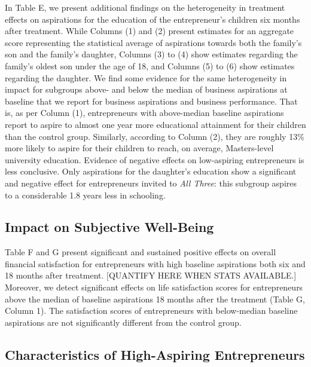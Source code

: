 \documentclass[11.5pt]{article}
\begin{document}
In Table E, we present additional findings on the heterogeneity in treatment effects on aspirations for the education of the entrepreneur's children six months after treatment. While Columns (1) and (2) present estimates for an aggregate score representing the statistical average of aspirations towards both the family's son and the family's daughter, Columns (3) to (4) show estimates regarding the family's oldest son under the age of 18, and Columns (5) to (6) show estimates regarding the daughter. We find some evidence for the same heterogeneity in impact for subgroups above- and below the median of business aspirations at baseline that we report for business aspirations and business performance. That is, as per Column (1), entrepreneurs with above-median baseline aspirations report to aspire to almost one year more educational attainment for their children than the control group. Similarly, according to Column (2), they are roughly 13\% more likely to aspire for their children to reach, on average, Masters-level university education. Evidence of negative effects on low-aspiring entrepreneurs is less conclusive. Only aspirations for the daughter's education show a significant and negative effect for entrepreneurs invited to \emph{All Three}: this subgroup aspires to a considerable 1.8 years less in schooling. 

\subsection{Impact on Subjective Well-Being}

Table F and G present significant and sustained positive effects on overall financial satisfaction for entrepreneurs with high baseline aspirations both six and 18 months after treatment. [QUANTIFY HERE WHEN STATS AVAILABLE.] Moreover, we detect significant effects on life satisfaction scores for entrepreneurs above the median of baseline aspirations 18 months after the treatment (Table G, Column 1). The satisfaction scores of entrepreneurs with below-median baseline aspirations are not significantly different from the control group.

\subsection{Characteristics of High-Aspiring Entrepreneurs}
\end{document}
